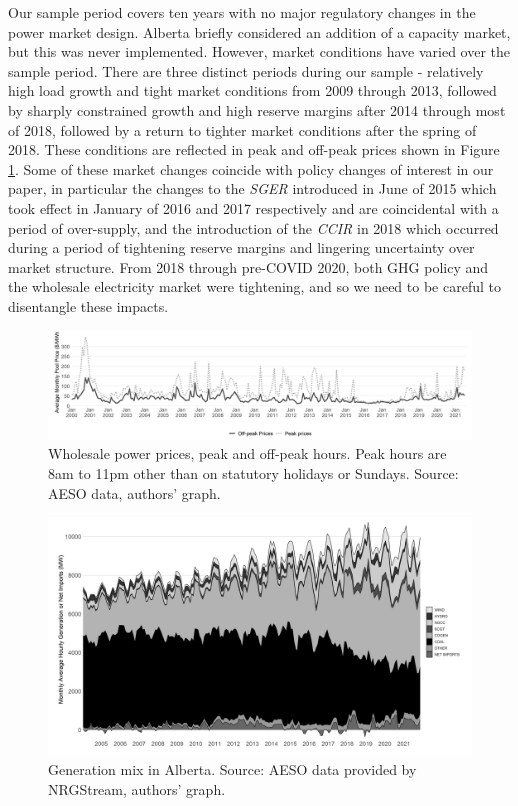 \documentclass[12pt]{article}
\begin{document}
Our sample period covers ten years with no major regulatory changes in the power market design. Alberta briefly considered an addition of a capacity market, but this was never implemented. However, market conditions have varied over the sample period. There are three distinct periods during our sample - relatively high load growth and tight market conditions from 2009 through 2013, followed by sharply constrained growth and high reserve margins after 2014 through most of 2018, followed by a return to tighter market conditions after the spring of 2018. These conditions are reflected in peak and off-peak prices shown in Figure \ref{fig:ab_prices}. Some of these market changes coincide with policy changes of interest in our paper, in particular the changes to the \emph{SGER} introduced in June of 2015 which took effect in January of 2016 and 2017 respectively and are coincidental with a period of over-supply, and the introduction of the \emph{CCIR} in 2018 which occurred during a period of tightening reserve margins and lingering uncertainty over market structure. From 2018 through pre-COVID 2020, both GHG policy and the wholesale electricity market were tightening, and so we need to be careful to disentangle these impacts.

\begin{figure}[t]%
	\centering \vspace{-.25cm} \includegraphics[width=6.5in]{../images/peak_prices.png}
\vspace{-0.75cm}	\caption{Wholesale power prices, peak and off-peak hours. Peak hours are 8am to 11pm other than on statutory holidays or Sundays. Source: AESO data, authors' graph.}
\label{fig:ab_prices}
\end{figure}

\begin{figure}[t]%
	\centering \vspace{-.25cm} \includegraphics[width=6.5in]{../images/gen_area_grey.png}
\vspace{-0.75cm}	\caption{Generation mix in Alberta.  Source: AESO data provided by NRGStream, authors' graph.}
\label{fig:gen_mix}
\end{figure}
\end{document}
